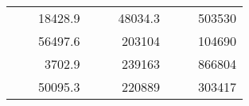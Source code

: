 \begin{table}[H]
\begin{tabular}{|ccrccrccr}
\rowcolor[HTML]{DDFDFF} 
\multicolumn{1}{|c|}{\cellcolor[HTML]{FFFFC7}}                                & \multicolumn{1}{c|}{\cellcolor[HTML]{DDFDFF}}                      & \multicolumn{1}{r|}{\cellcolor[HTML]{DAE8FC}18428.9}   & \multicolumn{1}{c|}{\cellcolor[HTML]{FFFFC7}}                                & \multicolumn{1}{c|}{\cellcolor[HTML]{DDFDFF}}                       & \multicolumn{1}{r|}{\cellcolor[HTML]{DDFDFF}48034.3}   & \multicolumn{1}{c|}{\cellcolor[HTML]{FFFFC7}}                                & \multicolumn{1}{c|}{\cellcolor[HTML]{DDFDFF}}                      & \multicolumn{1}{r|}{\cellcolor[HTML]{DDFDFF}503530}    \\ \cline{3-3} \cline{6-6} \cline{9-9} 
\multicolumn{1}{|c|}{\cellcolor[HTML]{FFFFC7}}                                & \multicolumn{1}{c|}{\cellcolor[HTML]{DDFDFF}}                      & \multicolumn{1}{r|}{\cellcolor[HTML]{DDFDFF}56497.6}   & \multicolumn{1}{c|}{\cellcolor[HTML]{FFFFC7}}                                & \multicolumn{1}{c|}{\cellcolor[HTML]{DDFDFF}}                       & \multicolumn{1}{r|}{\cellcolor[HTML]{DAE8FC}203104}    & \multicolumn{1}{c|}{\cellcolor[HTML]{FFFFC7}}                                & \multicolumn{1}{c|}{\cellcolor[HTML]{DDFDFF}}                      & \multicolumn{1}{r|}{\cellcolor[HTML]{DAE8FC}104690}    \\ \cline{3-3} \cline{6-6} \cline{9-9} 
\rowcolor[HTML]{DDFDFF} 
\multicolumn{1}{|c|}{\cellcolor[HTML]{FFFFC7}}                                & \multicolumn{1}{c|}{\cellcolor[HTML]{DDFDFF}}                      & \multicolumn{1}{r|}{\cellcolor[HTML]{DAE8FC}3702.9}    & \multicolumn{1}{c|}{\cellcolor[HTML]{FFFFC7}}                                & \multicolumn{1}{c|}{\cellcolor[HTML]{DDFDFF}}                       & \multicolumn{1}{r|}{\cellcolor[HTML]{DDFDFF}239163}    & \multicolumn{1}{c|}{\cellcolor[HTML]{FFFFC7}}                                & \multicolumn{1}{c|}{\cellcolor[HTML]{DDFDFF}}                      & \multicolumn{1}{r|}{\cellcolor[HTML]{DDFDFF}866804}    \\ \cline{3-3} \cline{6-6} \cline{9-9} 
\multicolumn{1}{|c|}{\cellcolor[HTML]{FFFFC7}}                                & \multicolumn{1}{c|}{\cellcolor[HTML]{DDFDFF}}                      & \multicolumn{1}{r|}{\cellcolor[HTML]{DDFDFF}50095.3}   & \multicolumn{1}{c|}{\cellcolor[HTML]{FFFFC7}}                                & \multicolumn{1}{c|}{\cellcolor[HTML]{DDFDFF}}                       & \multicolumn{1}{r|}{\cellcolor[HTML]{DAE8FC}220889}    & \multicolumn{1}{c|}{\cellcolor[HTML]{FFFFC7}}                                & \multicolumn{1}{c|}{\cellcolor[HTML]{DDFDFF}}                      & \multicolumn{1}{r|}{\cellcolor[HTML]{DAE8FC}303417}    \\ \cline{3-3} \cline{6-6} \cline{9-9} 

\end{tabular}
\end{table}
